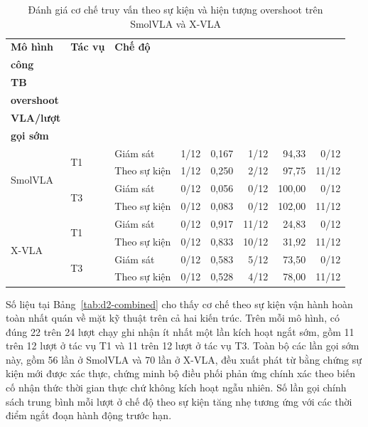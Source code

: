 \begin{table}[htbp]
\centering\footnotesize
\caption{Đánh giá cơ chế truy vấn theo sự kiện và hiện tượng overshoot trên SmolVLA và X-VLA}
\label{tab:d2-combined}
\label{tab:d2-decision-results}
\label{tab:d2-calibration-results}
\setlength{\tabcolsep}{3.5pt}
\begin{tabular}{|l|l|l|r|r|r|r|r|}
\hline
\textbf{Mô hình} & \textbf{Tác vụ} & \textbf{Chế độ} & \shortstack{\textbf{Thành}\\\textbf{công}} & \shortstack{\textbf{SCR}\\\textbf{TB}} & \shortstack{\textbf{Vi phạm}\\\textbf{overshoot}} & \shortstack{\textbf{Lần gọi}\\\textbf{VLA/lượt}} & \shortstack{\textbf{Lượt có}\\\textbf{gọi sớm}} \\ \hline
\multirow{4}{*}{SmolVLA} & \multirow{2}{*}{T1} & Giám sát & 1/12 & 0,167 & 1/12 & 94,33 & 0/12 \\ \cline{3-8}
        &    & Theo sự kiện & 1/12 & 0,250 & 2/12 & 97,75 & 11/12 \\ \cline{2-8}
        & \multirow{2}{*}{T3} & Giám sát & 0/12 & 0,056 & 0/12 & 100,00 & 0/12 \\ \cline{3-8}
        &    & Theo sự kiện & 0/12 & 0,083 & 0/12 & 102,00 & 11/12 \\ \hline
\multirow{4}{*}{X-VLA}   & \multirow{2}{*}{T1} & Giám sát & 0/12 & 0,917 & 11/12 & 24,83 & 0/12 \\ \cline{3-8}
        &    & Theo sự kiện & 0/12 & 0,833 & 10/12 & 31,92 & 11/12 \\ \cline{2-8}
        & \multirow{2}{*}{T3} & Giám sát & 0/12 & 0,583 & 5/12 & 73,50 & 0/12 \\ \cline{3-8}
        &    & Theo sự kiện & 0/12 & 0,528 & 4/12 & 78,00 & 11/12 \\ \hline
\end{tabular}
\end{table}

Số liệu tại Bảng~\ref{tab:d2-combined} cho thấy cơ chế theo sự kiện vận hành hoàn toàn nhất quán về mặt kỹ thuật trên cả hai kiến trúc. Trên mỗi mô hình, có đúng 22 trên 24 lượt chạy ghi nhận ít nhất một lần kích hoạt ngắt sớm, gồm 11 trên 12 lượt ở tác vụ T1 và 11 trên 12 lượt ở tác vụ T3. Toàn bộ các lần gọi sớm này, gồm 56 lần ở SmolVLA và 70 lần ở X-VLA, đều xuất phát từ bằng chứng sự kiện mới được xác thực, chứng minh bộ điều phối phản ứng chính xác theo biến cố nhận thức thời gian thực chứ không kích hoạt ngẫu nhiên. Số lần gọi chính sách trung bình mỗi lượt ở chế độ theo sự kiện tăng nhẹ tương ứng với các thời điểm ngắt đoạn hành động trước hạn.

